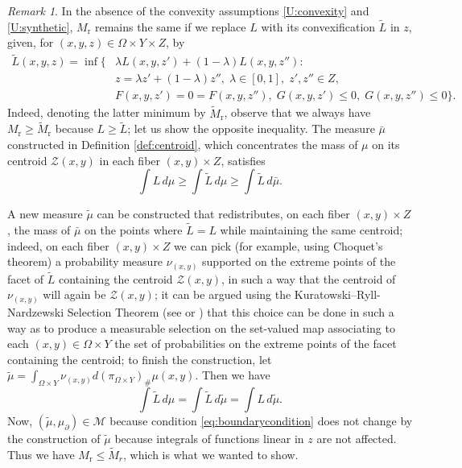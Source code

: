 \documentclass{article}
\theoremstyle{definition}
\theoremstyle{remark}
\newtheorem{remark}[theorem]{Remark}
\newcommand{\proj}{\pi}
\newcommand{\projXY}{\proj_{\Omega\times Y}}
\begin{document}
\begin{remark}
In the absence of the convexity assumptions \ref{U:convexity} and \ref{U:synthetic}, $M_{\mathrm{r}}$ remains the same if we replace $L$ with its convexification $\tilde L$ in $z$, given, for $(x,y,z)\in \Omega\times Y\times Z$, by
 \begin{align*}\tilde L(x,y,z)=\inf \{&\lambda L(x,y,z')+(1-\lambda)L(x,y,z''):\\
 &z=\lambda z'+(1-\lambda)z'',\;\lambda\in[0,1],\;z',z''\in Z,\\
 &F(x,y,z')=0=F(x,y,z''),\;G(x,y,z')\leq 0,\;G(x,y,z'')\leq 0\}.
%
 \end{align*}
  Indeed, denoting the latter minimum by $\tilde M_\mathrm{r}$, observe that we always have $M_\mathrm{r}\geq \tilde M_\mathrm{r}$ because $L\geq \tilde L$; let us show the opposite inequality. The measure $\bar\mu$ constructed in Definition \ref{def:centroid}, which concentrates the mass of $\mu$ on its centroid $\mathcal Z(x,y)$ in each fiber $(x,y)\times Z$, satisfies
 \[\int L\,d\mu\geq \int \tilde L\,d\mu\geq\int \tilde L\,d\bar\mu.\]

 
 A new measure $\tilde\mu$ can be constructed that redistributes, on each fiber $(x,y) \times Z$, the mass of $\bar\mu$ on the points where $\tilde L=L$ while maintaining the same centroid; indeed, on each fiber $(x,y)\times Z$ we can pick (for example, using Choquet's theorem) a probability measure $\nu_{(x,y)}$ supported on the extreme points of the facet of $\tilde L$ containing the centroid $\mathcal Z(x,y)$, in such a way that the centroid of $\nu_{(x,y)}$ will again be $\mathcal Z(x,y)$; it can be argued using the Kuratowski--Ryll-Nardzewski Selection Theorem (see \cite[Th. 18.13]{aliprantisborder} or \cite[Th.\ 8.1.3]{aubinfrankowska}) %
 that this choice can be done in such a way as to produce a measurable selection on the set-valued map associating to each $(x,y)\in\Omega\times Y$ the set of probabilities on the extreme points of the facet containing the centroid; to finish the construction, let $\tilde\mu=\int_{\Omega\times Y}\nu_{(x,y)}d(\projXY)_\#\mu(x,y)$.
 Then we have
 \[\int \tilde L\,d\mu=\int \tilde L\,d\tilde\mu=\int L\,d\tilde\mu.\]
 Now, $(\tilde\mu,\mu_\partial)\in\mathcal M$ because condition \eqref{eq:boundarycondition} does not change by the construction of $\tilde\mu$ because integrals of functions linear in $z$ are not affected. Thus we have $M_\mathrm{r}\leq \tilde M_r$, which is what we wanted to show.
\end{remark}
\end{document}
